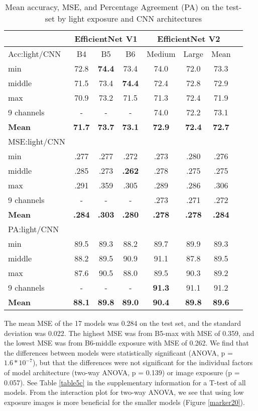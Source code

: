 \documentclass[10pt,letterpaper]{article}
\begin{document}
\begin{table}[hbt!]
\caption{Mean accuracy, MSE, and Percentage Agreement (PA) on the test-set by light exposure and CNN architectures}
\begin{tabular}{ |l|c|c|c|c|c|c|c|} \hline
    & \multicolumn{3}{|c|}{EfficientNet V1} & \multicolumn{3}{|c|}{EfficientNet V2} \\ \hline
    Acc:light/CNN & B4 & B5 & B6 & Medium & Large & Mean \\ \hline
    min        & 72.8 & {\bf 74.4} & 73.4      & 74.0 & 72.0 & 73.3 \\ 
    middle     & 71.5 & 73.4        & {\bf 74.4} & 72.4 & 72.8 & 72.9 \\ 
    max        & 70.9 & 73.2        & 71.5       & 71.3 & 72.4 & 71.9 \\ 
    9 channels & -    & -           & -          & 74.0 & 72.2 & 73.1 \\  \hline
    {\bf Mean} & {\bf 71.7} & {\bf 73.7}     & {\bf 73.1}  & {\bf 72.9} & {\bf 72.4} & {\bf 72.7} \\  \hline
    MSE:light/CNN &  &    &       &  &  &  \\ \hline
    min        & .277 & .277 & .272      & .273 & .280  & .276 \\ 
    middle     & .285 & .273 & {\bf.262} & .278 & .275  & .275 \\ 
    max        & .291 & .359 & .305      & .289 & .286  & .306 \\ 
    9 channels & -    & -    & -         & .273 & .271  & .272 \\ \hline
    {\bf Mean}       & {\bf.284} & {\bf.303} & {\bf.280}  & {\bf.278} & {\bf.278}  & {\bf.284} \\ \hline
    PA:light/CNN &    &    &    &      &  &  \\ \hline
    min          & 89.5 & 89.3 & 88.2 & 89.7       & 89.9 & 89.3 \\ 
    middle       & 88.2 & 89.5 & 90.9 & 91.1       & 87.8 & 89.5 \\ 
    max          & 87.6 & 90.5 & 88.0 & 89.5       & 90.3 & 89.2 \\ 
    9 channels   & -    & -     & -   & {\bf91.3} & 91.1 & 91.2 \\ \hline
    {\bf Mean}   & {\bf 88.1} & {\bf 89.8} & {\bf 89.0} & {\bf 90.4} & {\bf 89.8} & {\bf 89.6}  \\ \hline    
\end{tabular}
\label{table4}
\end{table}
The mean MSE of the 17 models was 0.284 on the test set, and the standard deviation was 0.022.
The highest MSE was from B5-max with MSE of 0.359, and the lowest MSE was from B6-middle exposure with MSE of 0.262.
We find that the differences between models were statistically significant (ANOVA, p = $1.6 *10^{-7}$), but that the differences were not significant for the individual factors of model architecture (two-way ANOVA, p = 0.139) or image exposure (p = 0.057). See Table \ref{table5c} in the supplementary information for a T-test of all models.  From the interaction plot for two-way ANOVA, we see that using low exposure images is more beneficial for the smaller models (Figure \ref{marker20}).
\end{document}
